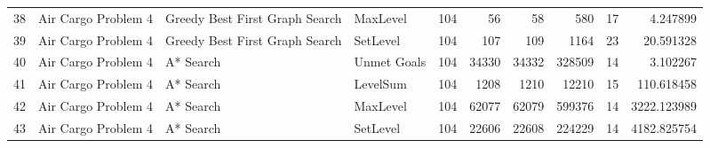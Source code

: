 \begin{tabular}{llllrrrrrr}
38 &  Air Cargo Problem 4 &  Greedy Best First Graph Search &     MaxLevel &      104 &          56 &          58 &        580 &           17 &     4.247899 \\
39 &  Air Cargo Problem 4 &  Greedy Best First Graph Search &     SetLevel &      104 &         107 &         109 &       1164 &           23 &    20.591328 \\
40 &  Air Cargo Problem 4 &                       A* Search &  Unmet Goals &      104 &       34330 &       34332 &     328509 &           14 &     3.102267 \\
41 &  Air Cargo Problem 4 &                       A* Search &     LevelSum &      104 &        1208 &        1210 &      12210 &           15 &   110.618458 \\
42 &  Air Cargo Problem 4 &                       A* Search &     MaxLevel &      104 &       62077 &       62079 &     599376 &           14 &  3222.123989 \\
43 &  Air Cargo Problem 4 &                       A* Search &     SetLevel &      104 &       22606 &       22608 &     224229 &           14 &  4182.825754 \\
\bottomrule
\end{tabular}
